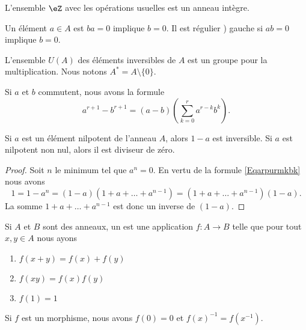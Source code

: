 \begin{example}
    L'ensemble \( \eZ\) avec les opérations usuelles est un anneau intègre.
\end{example}

Un élément \( a\in A\) est  \( ba=0\) implique \( b=0\). Il est régulier ) gauche si \( ab=0\) implique \( b=0\).

L'ensemble \( U(A)\) des éléments inversibles de \( A\) est un groupe pour la multiplication. Nous notons \( A^*=A\setminus\{ 0 \}\).

\begin{lemma}
    Si \( a\) et \( b\) commutent, nous avons la formule
    \begin{equation}        \label{Eqarpurmkbk}
        a^{r+1}-b^{r+1}=(a-b)(\sum_{k=0}^ra^{r-k}b^k).
    \end{equation}
\end{lemma}

\begin{proposition}
    Si \( a\) est un élément nilpotent de l'anneau \( A\), alors \( 1-a\) est inversible. Si \( a\) est nilpotent non nul, alors il est diviseur de zéro.
\end{proposition}

\begin{proof}
    Soit \( n\) le minimum tel que \( a^n=0\). En vertu de la formule \eqref{Eqarpurmkbk} nous avons
    \begin{equation}
        1=1-a^n=(1-a)(1+a+\ldots+a^{n-1})=(1+a+\ldots+a^{n-1})(1-a).
    \end{equation}
    La somme \( 1+a+\ldots+a^{n-1}\) est donc un inverse de \( (1-a)\).
\end{proof}

\begin{definition}
    Si \( A\) et \( B\) sont des anneaux, un  est une application \( f\colon A\to B\) telle que pour tout \( x,y\in A\) nous ayons
    \begin{enumerate}
        \item
            \( f(x+y)=f(x)+f(y)\)
        \item
            \( f(xy)=f(x)f(y)\)
        \item
            \( f(1)=1\)
    \end{enumerate}
\end{definition}

Si \( f\) est un morphisme, nous avons \( f(0)=0\) et \( f(x)^{-1}=f(x^{-1})\).

